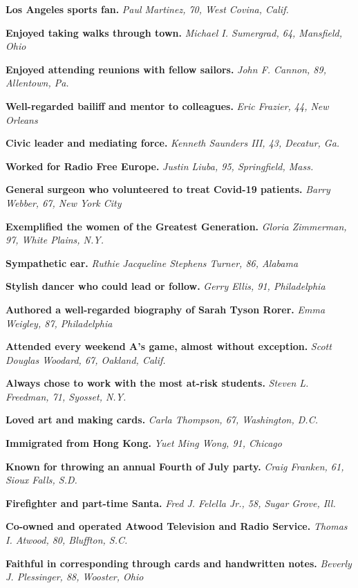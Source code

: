 \textbf{Los Angeles sports fan.} \emph{Paul Martinez, 70, West Covina,
Calif.}

\textbf{Enjoyed taking walks through town.} \emph{Michael I. Sumergrad,
64, Mansfield, Ohio}

\textbf{Enjoyed attending reunions with fellow sailors.} \emph{John F.
Cannon, 89, Allentown, Pa.}

\textbf{Well-regarded bailiff and mentor to colleagues.} \emph{Eric
Frazier, 44, New Orleans}

\textbf{Civic leader and mediating force.} \emph{Kenneth Saunders III,
43, Decatur, Ga.}

\textbf{Worked for Radio Free Europe.} \emph{Justin Liuba, 95,
Springfield, Mass.}

\textbf{General surgeon who volunteered to treat Covid-19 patients.}
\emph{Barry Webber, 67, New York City}

\textbf{Exemplified the women of the Greatest Generation.} \emph{Gloria
Zimmerman, 97, White Plains, N.Y.}

\textbf{Sympathetic ear.} \emph{Ruthie Jacqueline Stephens Turner, 86,
Alabama}

\textbf{Stylish dancer who could lead or follow.} \emph{Gerry Ellis, 91,
Philadelphia}

\textbf{Authored a well-regarded biography of Sarah Tyson Rorer.}
\emph{Emma Weigley, 87, Philadelphia}

\textbf{Attended every weekend A's game, almost without exception.}
\emph{Scott Douglas Woodard, 67, Oakland, Calif.}

\textbf{Always chose to work with the most at-risk students.}
\emph{Steven L. Freedman, 71, Syosset, N.Y.}

\textbf{Loved art and making cards.} \emph{Carla Thompson, 67,
Washington, D.C.}

\textbf{Immigrated from Hong Kong.} \emph{Yuet Ming Wong, 91, Chicago}

\textbf{Known for throwing an annual Fourth of July party.} \emph{Craig
Franken, 61, Sioux Falls, S.D.}

\textbf{Firefighter and part-time Santa.} \emph{Fred J. Felella Jr., 58,
Sugar Grove, Ill.}

\textbf{Co-owned and operated Atwood Television and Radio Service.}
\emph{Thomas I. Atwood, 80, Bluffton, S.C.}

\textbf{Faithful in corresponding through cards and handwritten notes.}
\emph{Beverly J. Plessinger, 88, Wooster, Ohio}

